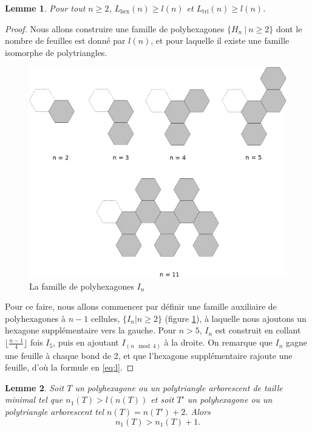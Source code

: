 \documentclass{article}
\newtheorem{lem}{Lemme}[section]
\theoremstyle{definition}
\newcommand{\Lhex}{L_{\text{hex}}}
\newcommand{\Ltri}{L_{\text{tri}}}
\begin{document}
\begin{lem}
   Pour tout $n \geq 2$, $\Lhex(n) \geq l(n)$ et $\Ltri(n) \geq l(n)$.
\end{lem}
\begin{proof}
   Nous allons construire une famille de polyhexagones 
   $\{ H_n\ |\ n \geq 2\}$ dont le nombre de feuilles est donné 
   par $l(n)$, et pour laquelle il existe une famille isomorphe 
   de polytriangles.
   
   \begin{figure}[h!]
   \caption{La famille de polyhexagones $I_n$}
   \label{fig:In}
   \includegraphics[width=\textwidth]{In.eps}
   \end{figure}

   Pour ce faire, nous allons commencer par définir une famille
   auxiliaire de polyhexagones à $n - 1$ cellules, $\{I_n | n \geq 2\}$ 
   (figure \ref{fig:In}), à laquelle nous ajoutons un hexagone 
   supplémentaire vers la gauche. Pour $n>5$, $I_n$ est construit en 
   collant $\lfloor \frac{n-1}{4} \rfloor$ fois $I_5$, puis en ajoutant 
   $I_{(n \mod 4)}$ à la droite. On remarque que $I_n$ gagne une feuille 
   à chaque bond de 2, et que l'hexagone supplémentaire rajoute une 
   feuille, d'où la formule en \eqref{eq:l}. 
\end{proof}

\begin{lem}
   \label{lem:hyp}
   Soit $T$ un polyhexagone ou un polytriangle arborescent de taille minimal tel que $n_1(T) > l(n(T))$ et soit $T'$ un polyhexagone ou un polytriangle arborescent tel $n(T) = n(T') + 2$. Alors
   \[
      n_1(T) > n_1(T) + 1.
   \]
\end{lem}
\end{document}
